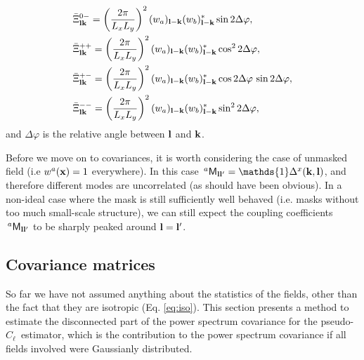 \documentclass[a4paper,11pt]{article}
\newcommand{\PCL}{pseudo-$C_\ell$~}
\begin{document}
\begin{itemize}
\begin{align}
        &\bar{\Xi}^{0-}_{{\bf l}{\bf k}}=\left(\frac{2\pi}{L_xL_y}\right)^2 (w_a)_{{\bf l}-{\bf k}}(w_b)^*_{{\bf l}-{\bf k}}\sin2\Delta\varphi,\\
        &\bar{\Xi}^{++}_{{\bf l}{\bf k}}=\left(\frac{2\pi}{L_xL_y}\right)^2 (w_a)_{{\bf l}-{\bf k}}(w_b)^*_{{\bf l}-{\bf k}}\cos^22\Delta\varphi,\\
        &\bar{\Xi}^{+-}_{{\bf l}{\bf k}}=\left(\frac{2\pi}{L_xL_y}\right)^2 (w_a)_{{\bf l}-{\bf k}}(w_b)^*_{{\bf l}-{\bf k}}\cos2\Delta\varphi\,\sin2\Delta\varphi,\\
        &\bar{\Xi}^{--}_{{\bf l}{\bf k}}=\left(\frac{2\pi}{L_xL_y}\right)^2 (w_a)_{{\bf l}-{\bf k}}(w_b)^*_{{\bf l}-{\bf k}}\sin^22\Delta\varphi,\\
      \end{align}
      and $\Delta\varphi$ is the relative angle between ${\bf l}$ and ${\bf k}$.
    \end{itemize}

    Before we move on to covariances, it is worth considering the case of unmasked field (i.e $w^a({\bf x})=1$ everywhere). In this case $\,^a{\sf M}_{{\bf l}{\bf l}'}=\mathds{1}\Delta^x({\bf k},{\bf l})$, and therefore different modes are uncorrelated (as should have been obvious). In a non-ideal case where the mask is still sufficiently well behaved (i.e. masks without too much small-scale structure), we can still expect the coupling coefficients $\,^a{\sf M}_{{\bf l}{\bf l}'}$ to be sharply peaked around ${\bf l}={\bf l}'$.
  
  \subsection{Covariance matrices}\label{ssec:theory.pclcov}
    So far we have not assumed anything about the statistics of the fields, other than the fact that they are isotropic (Eq. \ref{eq:iso}). This section presents a method to estimate the disconnected part of the power spectrum covariance for the \PCL estimator, which is the contribution to the power spectrum covariance if all fields involved were Gaussianly distributed.
    
\end{document}
